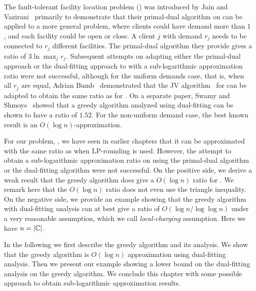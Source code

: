 \documentclass[oneside,final]{ucr}
\begin{document}
The fault-tolerant facility location problem ({\FTFL}) was
introduced by Jain and Vazirani~\cite{JainV03} primarily to
demonstrate that their primal-dual algorithm on {\UFL} can
be applied to a more general problem, where clients could
have demand more than $1$, and each facility could be open
or close. A client $j$ with demand $r_j$ needs to be
connected to $r_j$ different facilities. The primal-dual
algorithm they provide gives a ratio of $3\ln \max_j
r_j$. Subsequent attempts on adapting either the primal-dual
approach or the dual-fitting approach to {\FTFL} with a
sub-logarithmic approximation ratio were not successful,
although for the uniform demands case, that is, when all
$r_j$ are equal, Adrian Bumb~\cite{Bumb02} demonstrated that
the JV algorithm~\cite{JainV01} for {\UFL} can be adapted to
obtain the same ratio as for {\UFL}. On a separate paper,
Swamy and Shmoys~\cite{SwamyS08} showed that a greedy
algorithm analyzed using dual-fitting can be shown to have a
ratio of $1.52$. For the non-uniform demand case, the best
known result is an $O(\log n)$-approximation.

For our problem, {\FTFP}, we have seen in earlier chapters
that it can be approximated with the same ratio as {\UFL}
when LP-rounding is used. However, the attempt to obtain a
sub-logarithmic approximation ratio on {\FTFP} using the
primal-dual algorithm or the dual-fitting algorithm were not
successful. On the positive side, we derive a weak result
that the greedy algorithm does give a $O(\log n)$ ratio for
{\FTFP}. We remark here that the $O(\log n)$ ratio does not
even use the triangle inequality. On the negative side, we
provide an example showing that the greedy algorithm with
dual-fitting analysis can at best give a ratio of $O(\log n/
\log\log n)$ under a very reasonable assumption, which we
call \emph{local-charging} assumption. Here we have $n =
|\mathbb{C}|$.

In the following we first describe the greedy algorithm and
its analysis. We show that the greedy algorithm is $O(\log
n)$ approximation using dual-fitting analysis. Then we
present our example showing a lower bound on the
dual-fitting analysis on the greedy algorithm. We conclude
this chapter with some possible approach to obtain
sub-logarithmic approximation results.
\end{document}
